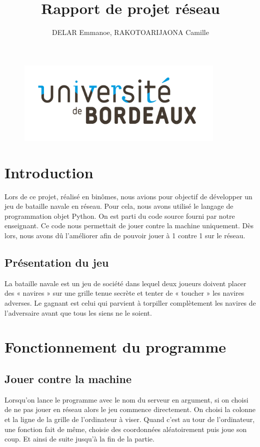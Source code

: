 \documentclass{article}
\title{Rapport de projet r\'eseau}
\author{DELAR Emmanoe, RAKOTOARIJAONA Camille}
\begin{document}
\maketitle
\begin{figure}[!b]
		\centering
		\includegraphics[height=4cm]{logo.jpg}
	\end{figure}
\newpage
\tableofcontents

\newpage
\section{Introduction}
Lors de ce projet, r\'ealis\'e en bin\^omes, nous avions pour objectif de d\'evelopper un jeu de bataille navale en r\'eseau. Pour cela, nous avons utilis\'e le langage de programmation objet Python.
On est parti du code source fourni par notre enseignant. Ce code nous permettait de jouer contre la machine uniquement. D\`es lors, nous avons d\^u l'am\'eliorer afin de pouvoir jouer \`a 1 contre 1 sur le r\'eseau.

\subsection{Pr\'esentation du jeu}
	 La bataille navale est un jeu de soci\'et\'e dans lequel deux joueurs doivent placer des « navires » sur une grille tenue secrète et tenter de « toucher » les navires adverses. Le gagnant est celui qui parvient \`a torpiller compl\`etement les navires de l'adversaire avant que tous les siens ne le soient.


\section{Fonctionnement du programme}
	 \subsection{Jouer contre la machine}
	 Lorsqu'on lance le programme avec le nom du serveur en argument, si on choisi de ne pas jouer en r\'eseau alors le jeu commence directement. On choisi la colonne et la ligne de la grille de l'ordinateur \`a viser. Quand c'est au tour de l'ordinateur, une fonction fait de m\^eme, choisie des coordonn\'ees al\'eatoirement puis joue son coup. Et ainsi de suite jusqu'\`a la fin de la partie. 
\end{document}
